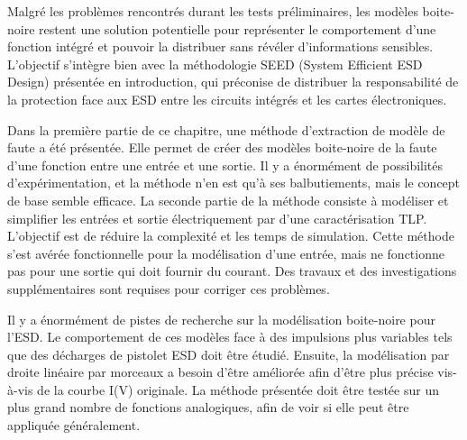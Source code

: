 Malgré les problèmes rencontrés durant les tests préliminaires, les modèles boite-noire restent une solution potentielle pour représenter le comportement d'une fonction intégré et pouvoir la distribuer sans révéler d'informations sensibles.
L'objectif s'intègre bien avec la méthodologie SEED (System Efficient ESD Design) \cite{seed} présentée en introduction, qui préconise de distribuer la responsabilité de la protection face aux ESD entre les circuits intégrés et les cartes électroniques.

Dans la première partie de ce chapitre, une méthode d'extraction de modèle de faute a été présentée.
Elle permet de créer des modèles boite-noire de la faute d'une fonction entre une entrée et une sortie.
Il y a énormément de possibilités d'expérimentation, et la méthode n'en est qu'à ses balbutiements, mais le concept de base semble efficace.
La seconde partie de la méthode consiste à modéliser et simplifier les entrées et sortie électriquement par d'une caractérisation TLP.
L'objectif est de réduire la complexité et les temps de simulation.
Cette méthode s'est avérée fonctionnelle pour la modélisation d'une entrée, mais ne fonctionne pas pour une sortie qui doit fournir du courant.
Des travaux et des investigations supplémentaires sont requises pour corriger ces problèmes.

Il y a énormément de pistes de recherche sur la modélisation boite-noire pour l'ESD.
Le comportement de ces modèles face à des impulsions plus variables tels que des décharges de pistolet ESD doit être étudié.
Ensuite, la modélisation par droite linéaire par morceaux a besoin d'être améliorée afin d'être plus précise vis-à-vis de la courbe I(V) originale.
La méthode présentée doit être testée sur un plus grand nombre de fonctions analogiques, afin de voir si elle peut être appliquée généralement.
